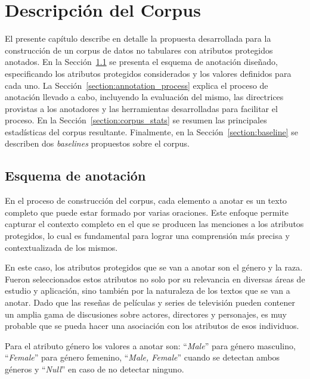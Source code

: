 \chapter{Descripci\'on del Corpus}\label{chapter:proposal}
El presente cap\'itulo describe en detalle la propuesta desarrollada para la construcci\'on de un corpus de datos no tabulares con 
atributos protegidos anotados. En la Secci\'on~\ref{section:annotation_scheme} se presenta el esquema de 
anotaci\'on dise\~nado, especificando los atributos protegidos considerados y los valores definidos para cada uno. La
Secci\'on~\ref{section:annotation_process} explica el proceso de anotaci\'on llevado a cabo, incluyendo la evaluaci\'on del 
mismo, las directrices provistas a los anotadores y las herramientas desarrolladas para facilitar el proceso. En la
Secci\'on~\ref{section:corpus_stats} se resumen las principales estad\'isticas del corpus resultante. Finalmente, en la 
Secci\'on~\ref{section:baseline} se describen dos \emph{baselines} propuestos sobre el corpus.

\section{Esquema de anotaci\'on}\label{section:annotation_scheme}
En el proceso de construcci\'on del corpus, cada elemento a anotar es un texto completo que puede estar formado por varias oraciones. 
Este enfoque permite capturar el contexto completo en el que se producen las menciones a los atributos protegidos, lo cual es fundamental
para lograr una comprensi\'on m\'as precisa y contextualizada de los mismos.

En este caso, los atributos protegidos que se van a anotar son el g\'enero y la raza.
Fueron seleccionados estos atributos no solo por su relevancia en diversas \'areas de estudio y aplicaci\'on, sino tambi\'en 
por la naturaleza de los textos que se van a anotar. Dado que las rese\~nas de pel\'iculas y series de televisi\'on
pueden contener un amplia gama de discusiones sobre actores, directores y personajes, es muy probable que se pueda hacer una 
asociaci\'on con los atributos de esos individuos.

Para el atributo g\'enero los valores a anotar son: ``\emph{Male}'' para g\'enero masculino, ``\emph{Female}'' para g\'enero femenino, 
``\emph{Male, Female}'' cuando se detectan ambos g\'eneros y ``\emph{Null}'' en caso de no detectar ninguno.

